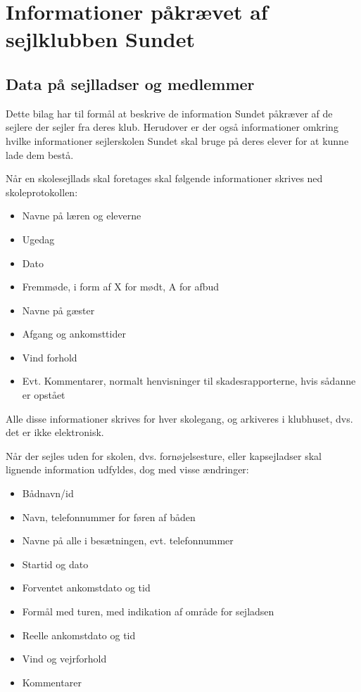 \chapter{Informationer påkrævet af sejlklubben Sundet}\label{bilag:sundet}

\section{Data på sejlladser og medlemmer}

Dette bilag har til formål at beskrive de information Sundet påkræver af de sejlere der sejler fra deres klub. Herudover er der også informationer omkring hvilke informationer sejlerskolen Sundet skal bruge på deres elever for at kunne lade dem bestå.

Når en skolesejllads skal foretages skal følgende informationer skrives ned skoleprotokollen:

\begin{itemize}
	\item Navne på læren og eleverne
	\item Ugedag
	\item Dato
	\item Fremmøde, i form af X for mødt, A for afbud
	\item Navne på gæster
	\item Afgang og ankomsttider
	\item Vind forhold
	\item Evt. Kommentarer, normalt henvisninger til skadesrapporterne, hvis sådanne er opstået
\end{itemize}

Alle disse informationer skrives for hver skolegang, og arkiveres i klubhuset, dvs. det er ikke elektronisk.

Når der sejles uden for skolen, dvs. fornøjelsesture, eller kapsejladser skal lignende information udfyldes, dog med visse ændringer:

\begin{itemize}
	\item Bådnavn/id
	\item Navn, telefonnummer for føren af båden
	\item Navne på alle i besætningen, evt. telefonnummer
	\item Startid og dato
	\item Forventet ankomstdato og tid
	\item Formål med turen, med indikation af område for sejladsen
	\item Reelle ankomstdato og tid
	\item Vind og vejrforhold
	\item Kommentarer
\end{itemize}

